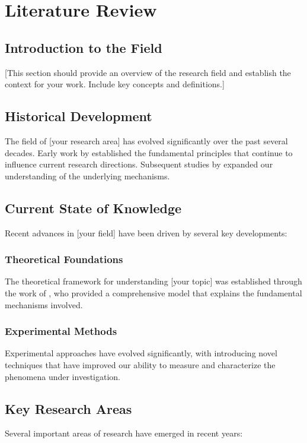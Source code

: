 \chapter{Literature Review}

\section{Introduction to the Field}
[This section should provide an overview of the research field and establish the context for your work. Include key concepts and definitions.]

\section{Historical Development}
The field of [your research area] has evolved significantly over the past several decades. Early work by \textcite{troitskii1969electromechanical} established the fundamental principles that continue to influence current research directions. Subsequent studies by \textcite{conrad2000electroplasticity} expanded our understanding of the underlying mechanisms.

\section{Current State of Knowledge}
Recent advances in [your field] have been driven by several key developments:

\subsection{Theoretical Foundations}
The theoretical framework for understanding [your topic] was established through the work of \textcite{kim2020elucidating}, who provided a comprehensive model that explains the fundamental mechanisms involved.

\subsection{Experimental Methods}
Experimental approaches have evolved significantly, with \textcite{xu2021enhanced} introducing novel techniques that have improved our ability to measure and characterize the phenomena under investigation.

\section{Key Research Areas}
Several important areas of research have emerged in recent years:

